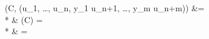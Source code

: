 \fieldMap{\Sigma}(C, (u_1, \ldots, u_n, y_1 \mathord{=} u_{n+1}, \ldots, y_m \mathord{=} u_{n+m}))
   &{}=  \\*
   &\qquad {} \fields{\Sigma}(C) =  \\*
   &\qquad {}  = 
